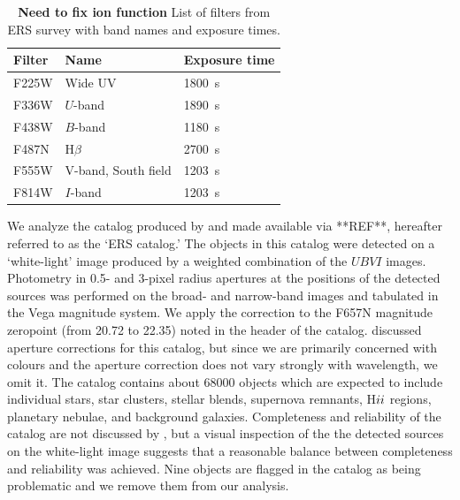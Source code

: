 \begin{table}
\centering
\caption{\textbf{Need to fix ion function} List of filters from ERS survey with band names and exposure times.}
\label{tab:filters}
\begin{tabular}{lll}
\hline\hline
Filter & Name & Exposure time\\
\hline
F225W &  Wide UV & 1800~s\\
F336W &  $U$-band & 1890~s\\ 
F438W &  $B$-band & 1180~s\\
F487N &  H$\beta$ & 2700~s\\
F555W &  V-band, South field & 1203~s\\
F814W &  $I$-band & 1203~s\\
\hline
\end{tabular}
\end{table}

We analyze the catalog produced by \citet{chandar10} and made available via **REF**, hereafter referred to as the `ERS catalog.'
The objects in this catalog were detected on a `white-light' image produced by a weighted combination of the $UBVI$ images.
Photometry in 0.5- and 3-pixel radius apertures at the positions of the detected sources was performed on the broad- and narrow-band images and tabulated in the Vega magnitude system. 
We apply the correction to the F657N magnitude zeropoint (from 20.72 to 22.35) noted in the header of the catalog.
\citet{chandar10} discussed aperture corrections for this catalog, but since we are primarily concerned with colours
and the aperture correction does not vary strongly with wavelength, we omit it.
The catalog contains about 68000 objects which are expected to include individual stars, star clusters, stellar blends,
supernova remnants, H${\sc ii}$ regions, planetary nebulae, and background galaxies.
Completeness and reliability of the catalog are not discussed by \citet{chandar10},
but a visual inspection of the the detected sources on the white-light image suggests that a reasonable balance
between completeness and reliability was achieved.
Nine objects are flagged in the catalog as being problematic 
and we remove them from our analysis.

